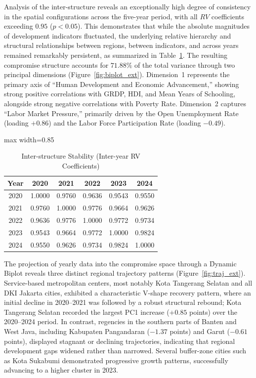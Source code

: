 \begin{singlespace}
Analysis of the inter-structure reveals an exceptionally high degree of consistency in the spatial configurations across the five-year period, with all $RV$ coefficients exceeding $0.95$ ($p < 0.05$). This demonstrates that while the absolute magnitudes of development indicators fluctuated, the underlying relative hierarchy and structural relationships between regions, between indicators, and across years remained remarkably persistent, as summarized in Table~\ref{tab:rv_summary_ext}. The resulting compromise structure accounts for $71.88\%$ of the total variance through two principal dimensions (Figure~\ref{fig:biplot_ext}). Dimension~1 represents the primary axis of ``Human Development and Economic Advancement,'' showing strong positive correlations with GRDP, HDI, and Mean Years of Schooling, alongside strong negative correlations with Poverty Rate. Dimension~2 captures ``Labor Market Pressure,'' primarily driven by the Open Unemployment Rate (loading $+0.86$) and the Labor Force Participation Rate (loading $-0.49$).

\begin{table}[H]
    \centering
    \captionsetup{hypcap=false}
    \caption{Inter-structure Stability (Inter-year RV Coefficients)}
    \label{tab:rv_summary_ext}
    \begin{adjustbox}{max width=0.85\textwidth}
    \begin{tabular}{|c|c|c|c|c|c|}
    \hline
    \textbf{Year} & \textbf{2020} & \textbf{2021} & \textbf{2022} & \textbf{2023} & \textbf{2024} \\
    \hline
    2020 & 1.0000 & 0.9760 & 0.9636 & 0.9543 & 0.9550 \\
    2021 & 0.9760 & 1.0000 & 0.9776 & 0.9664 & 0.9626 \\
    2022 & 0.9636 & 0.9776 & 1.0000 & 0.9772 & 0.9734 \\
    2023 & 0.9543 & 0.9664 & 0.9772 & 1.0000 & 0.9824 \\
    2024 & 0.9550 & 0.9626 & 0.9734 & 0.9824 & 1.0000 \\
    \hline
    \end{tabular}
    \end{adjustbox}
\end{table}

The projection of yearly data into the compromise space through a \f{Dynamic Biplot} reveals three distinct regional trajectory patterns (Figure~\ref{fig:traj_ext}). Service-based metropolitan centers, most notably Kota Tangerang Selatan and all DKI Jakarta cities, exhibited a characteristic V-shape recovery pattern, where an initial decline in 2020--2021 was followed by a robust structural rebound; Kota Tangerang Selatan recorded the largest PC1 increase ($+0.85$ points) over the 2020--2024 period. In contrast, regencies in the southern parts of Banten and West Java, including Kabupaten Pangandaran ($-1.37$ points) and Garut ($-0.61$ points), displayed stagnant or declining trajectories, indicating that regional development gaps widened rather than narrowed. Several buffer-zone cities such as Kota Sukabumi demonstrated progressive growth patterns, successfully advancing to a higher cluster in 2023.


\end{singlespace}
